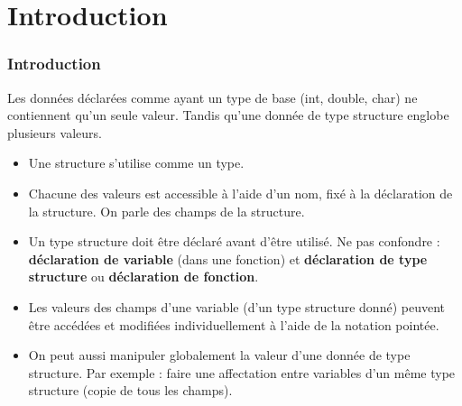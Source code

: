 \documentclass[xcolor=pdftex,svgnames,table]{beamer}
\begin{document}
\section[Plan]{}


\section[Introduction]{Introduction}
\begin{frame}
  \frametitle{Introduction}
\pause
Les données déclarées comme
ayant un type de base (int, double, char) ne contiennent qu'un seule
valeur. Tandis qu'une donnée de type structure \alert{englobe plusieurs
  valeurs}.\pause
\begin{itemize}
\item Une structure s'utilise comme un \alert{type}. \pause
\item Chacune des valeurs est accessible à l'aide d'un nom, fixé à la
  déclaration de la structure. On parle des \alert{champs} de la
  structure.\pause
\item Un type structure doit être déclaré avant d'être
  utilisé. Ne pas confondre : \textbf{déclaration de variable} (dans une
  fonction) et \textbf{déclaration de type structure} ou  \textbf{déclaration de fonction}.
\pause
\item Les valeurs des champs d'une variable (d'un type structure donné)
  peuvent être accédées et modifiées individuellement à l'aide de la
  \alert{notation pointée}. \pause
\item On peut aussi manipuler globalement la valeur d'une donnée de
  type structure. Par exemple : faire une affectation entre variables
  d'un même type structure (copie de tous les champs).
\end{itemize}
\end{frame}
\end{document}

